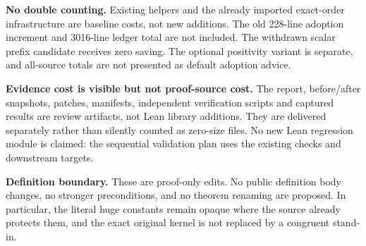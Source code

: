 \textbf{No double counting.} Existing helpers and the already imported exact-order infrastructure are baseline costs, not new additions. The old 228-line adoption increment and 3016-line ledger total are not included. The withdrawn scalar prefix candidate receives zero saving. The optional positivity variant is separate, and all-source totals are not presented as default adoption advice.

\textbf{Evidence cost is visible but not proof-source cost.} The report, before/after snapshots, patches, manifests, independent verification scripts and captured results are review artifacts, not Lean library additions. They are delivered separately rather than silently counted as zero-size files. No new Lean regression module is claimed: the sequential validation plan uses the existing checks and downstream targets.

\textbf{Definition boundary.} These are proof-only edits. No public definition body changes, no stronger preconditions, and no theorem renaming are proposed. In particular, the literal huge constants remain opaque where the source already protects them, and the exact original kernel is not replaced by a congruent stand-in.
